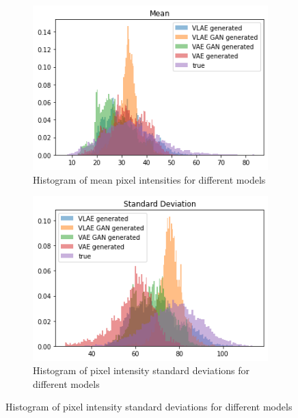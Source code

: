 \begin{figure}
    \centering
    \begin{subfigure}{0.4\textwidth}
        \centering
        \includegraphics[width=\textwidth]{images/generated_vs_true/mnist/mnist_vs_models_mean_gauss_post.png}
        \caption{Histogram of mean pixel intensities for different models}
        \label{subfig:mean_generated_vs_true_gauss_post}
    \end{subfigure}
    \hfill
    \begin{subfigure}{0.4\textwidth}
        \centering
        \includegraphics[width=\textwidth]{images/generated_vs_true/mnist/mnist_vs_models_sd_gauss_post.png}
        \caption{Histogram of pixel intensity standard deviations for different models}
        \label{subfig:sd_generated_vs_true_gauss_post}
    \end{subfigure}

\end{figure}
